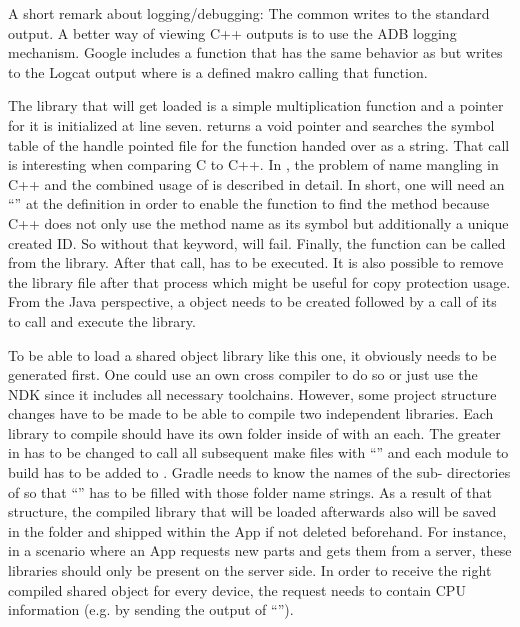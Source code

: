 A short remark about logging/debugging: The common  writes to the standard output. A better way of viewing C++ outputs is to use the ADB logging mechanism. Google includes a  function that
has the same behavior as  but writes to the Logcat output where
 is a defined makro calling that function.

The library that will get loaded is a simple multiplication function and a pointer
for it is initialized at line seven.  returns a void pointer and
 searches the symbol table of the handle pointed file for the function
handed over as a string. That call is interesting when comparing C to C++. In
\parencite{dlopen_howto}, the problem of name mangling in C++ and the combined usage of
 is described in detail.
In short, one will need an ``'' at the  definition in order to enable the  function to find the method
because C++ does not only use the method name as its symbol but additionally a unique created ID.
So without that  keyword,  will fail.
Finally, the  function can be called from the library.
After that call,  has to be executed. It is also possible to remove
the library file after that process which might be useful for copy protection usage.
From the Java perspective, a  object needs to be created followed by
a call of its  to call and execute the library.

To be able to load a shared object library like this one, it obviously needs to be
generated first. One could use an own cross compiler to do so or just use
the NDK since it includes all necessary toolchains.
However, some project structure changes have to be made to be able to compile two independent libraries. Each library to compile should have its own folder inside
of  with an  each. The greater  in
 has to be changed to call all subsequent make files with
``'' and each module to build has to be
added to . Gradle needs to know the names of the sub-
directories of  so that ``'' has to be
filled with those folder name strings. As a result of that structure, the compiled
library that will be loaded afterwards also will be saved in the  folder
and shipped within the App if not deleted beforehand. For instance, in a scenario where an App requests new
parts and gets them from a server, these libraries should only be
present on the server side. In order to receive the right compiled shared object for every
device, the request needs to contain CPU information (e.g. by sending the output
of ``'').

